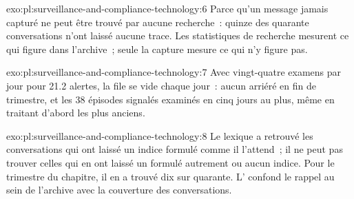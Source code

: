 \begin{solution}{exo:pl:surveillance-and-compliance-technology:6}
Parce qu'un message jamais capturé ne peut être trouvé par aucune recherche~: quinze des quarante conversations n'ont laissé aucune trace. Les statistiques de recherche
mesurent ce qui figure dans l'archive~; seule la capture mesure ce qui n'y figure pas.
\end{solution}

\begin{solution}{exo:pl:surveillance-and-compliance-technology:7}
Avec vingt-quatre examens par jour pour 21.2 alertes, la file se vide chaque jour~: aucun arriéré en fin de trimestre, et les 38 épisodes signalés
examinés en cinq jours au plus, même en traitant d'abord les plus anciens.
\end{solution}

\begin{solution}{exo:pl:surveillance-and-compliance-technology:8}
Le lexique a retrouvé les conversations qui ont laissé un indice formulé comme il l'attend~; il ne peut pas trouver celles qui en ont laissé un formulé autrement ou
aucun indice. Pour le trimestre du chapitre, il en a trouvé dix sur quarante. L' confond le rappel au sein de l'archive avec la couverture des
conversations.
\end{solution}

